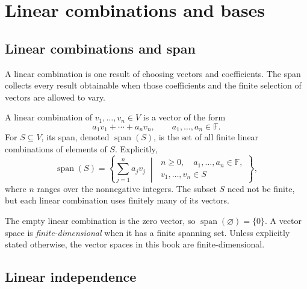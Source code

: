 \section{Linear combinations and bases}
\label{sec:linear-algebra-i:linear-combinations-and-bases}

\subsection{Linear combinations and span}

A linear combination is one result of choosing vectors and coefficients.
The span collects every result obtainable when those coefficients and the
finite selection of vectors are allowed to vary.

\begin{definition}
  A linear combination of \(v_1,\ldots,v_n\in V\) is a vector of the form
  \[
    a_1v_1+\cdots+a_nv_n,\qquad a_1,\ldots,a_n\in\mathbb F.
  \]
  For \(S\subseteq V\), its span, denoted \(\operatorname{span}(S)\), is the
  set of all finite linear combinations of elements of \(S\). Explicitly,
  \[
    \operatorname{span}(S)=
      \left\{\sum_{j=1}^n a_jv_j\;\middle|\;
        \begin{gathered}
          n\ge0,\quad a_1,\ldots,a_n\in\mathbb F,\\
          v_1,\ldots,v_n\in S
        \end{gathered}
      \right\},
  \]
  where \(n\) ranges over the nonnegative integers. The subset \(S\)
  need not be finite, but each linear combination uses finitely many
  of its vectors.
\end{definition}

The empty linear combination is the zero vector, so
\(\operatorname{span}(\varnothing)=\{0\}\). A vector space is
\emph{finite-dimensional} when it has a finite spanning set. Unless explicitly
stated otherwise, the vector spaces in this book are finite-dimensional.


\subsection{Linear independence}

